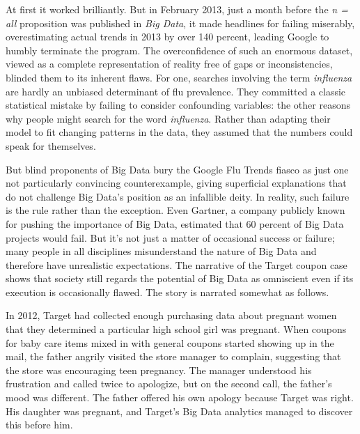 \documentclass[sigconf]{acmart}
\begin{document}
At first it worked brilliantly. But in February 2013, just a month before the {\em n = all} proposition was published in {\em Big Data}, it made headlines for failing miserably, overestimating actual trends in 2013 by over 140 percent, leading Google to humbly terminate the program. The overconfidence of such an enormous dataset, viewed as a complete representation of reality free of gaps or inconsistencies, blinded them to its inherent flaws. For one, searches involving the term {\em influenza} are hardly an unbiased determinant of flu prevalence. They committed a classic statistical mistake by failing to consider confounding variables: the other reasons why people might search for the word {\em influenza}. Rather than adapting their model to fit changing patterns in the data, they assumed that the numbers could speak for themselves\cite{Harford2014}. 

But blind proponents of Big Data bury the Google Flu Trends fiasco as just one not particularly convincing counterexample, giving superficial explanations that do not challenge Big Data's position as an infallible deity. In reality, such failure is the rule rather than the exception. Even Gartner, a company publicly known for pushing the importance of Big Data, estimated that 60 percent of Big Data projects would fail\cite{Gartner2015}. But it's not just a matter of occasional success or failure; many people in all disciplines misunderstand the nature of Big Data and therefore have unrealistic expectations. The narrative of the Target coupon case shows that society still regards the potential of Big Data as omniscient even if its execution is occasionally flawed. The story is narrated somewhat as follows.

In 2012, Target had collected enough purchasing data about pregnant women that they determined a particular high school girl was pregnant. When coupons for baby care items mixed in with general coupons started showing up in the mail, the father angrily visited the store manager to complain, suggesting that the store was encouraging teen pregnancy. The manager understood his frustration and called twice to apologize, but on the second call, the father's mood was different. The father offered his own apology because Target was right. His daughter was pregnant, and Target's Big Data analytics managed to discover this before him\cite{Duhigg2012}.
\end{document}
